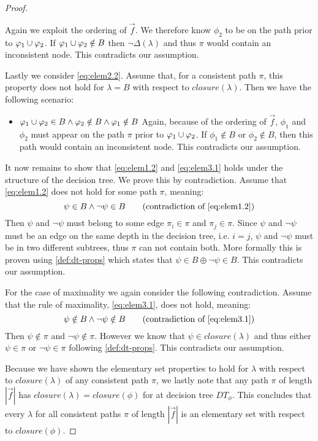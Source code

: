 \begin{proof}
\begin{itemize}
    Again we exploit the ordering of $\vec{f}$. We therefore know $\phi_2$ to be on the path prior to $\varphi_1 \cup \varphi_2$. If $\varphi_1 \cup \varphi_2 \notin B$ then $\lnot\Delta(\lambda)$ and thus $\pi$ would contain an inconsistent node. This contradicts our assumption.
\end{itemize}
Lastly we consider \autoref{eq:elem2.2}. Assume that, for a consistent path $\pi$, this property does not hold for $\lambda=B$ with respect to $closure(\lambda)$. Then we have the following scenario:
\begin{itemize}
    \item $\varphi_1 \cup \varphi_2 \in B \land \varphi_2 \notin B \land \varphi_1 \notin B$ \quad Again, because of the ordering of $\vec{f}$, $\phi_1$ and $\phi_2$ must appear on the path $\pi$ prior to $\varphi_1 \cup \varphi_2$. If $\phi_1 \notin B$ or $\phi_2 \notin B$, then this path would contain an inconsistent node. This contradicts our assumption.
\end{itemize}

It now remains to show that \autoref{eq:elem1.2} and \autoref{eq:elem3.1} holds under the structure of the decision tree. We prove this by contradiction. Assume that \autoref{eq:elem1.2} does not hold for some path $\pi$, meaning:
\begin{equation*}
    \psi \in B \land \lnot \psi \in B \tag{contradiction of \ref{eq:elem1.2}}
\end{equation*}
Then $\psi$ and $\lnot \psi$ must belong to some edge $\pi_i \in \pi$ and $\pi_j \in \pi$. Since $\psi$ and $\lnot\psi$ must be an edge on the same depth in the decision tree, i.e. $i=j$, $\psi$ and $\lnot \psi$ must be in two different subtrees, thus $\pi$ can not contain both. More formally this is proven using \autoref{def:dt-props} which states that $\psi \in B \oplus \lnot\psi \in B$. This contradicts our assumption.

For the case of maximality we again consider the following contradiction. Assume that the rule of maximality, \autoref{eq:elem3.1}, does not hold, meaning:
\begin{equation*}
    \psi \notin B \land \lnot \psi \notin B \tag{contradiction of \ref{eq:elem3.1}}
\end{equation*}
Then $\psi \notin \pi$ and $\lnot\psi \notin \pi$. However we know that $\psi \in closure(\lambda)$ and thus either $\psi \in \pi$ or $\lnot\psi \in \pi$ following \autoref{def:dt-props}. This contradicts our assumption.

Because we have shown the elementary set properties to hold for $\lambda$  with respect to $closure(\lambda)$ of any consistent path $\pi$, we lastly note that any path $\pi$ of length $|\vec{f}|$ has $closure(\lambda)=closure(\phi)$ for at decision tree $DT_\phi$. This concludes that every $\lambda$ for all consistent paths $\pi$ of length $|\vec{f}|$ is an elementary set with respect to $closure(\phi)$.
\end{proof}

